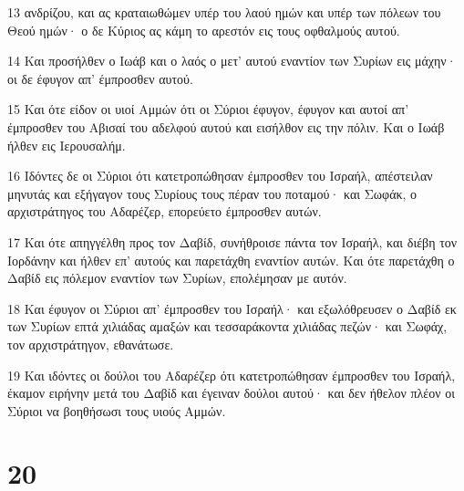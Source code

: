 \par 13 ανδρίζου, και ας κραταιωθώμεν υπέρ του λαού ημών και υπέρ των πόλεων του Θεού ημών· ο δε Κύριος ας κάμη το αρεστόν εις τους οφθαλμούς αυτού.
\par 14 Και προσήλθεν ο Ιωάβ και ο λαός ο μετ' αυτού εναντίον των Συρίων εις μάχην· οι δε έφυγον απ' έμπροσθεν αυτού.
\par 15 Και ότε είδον οι υιοί Αμμών ότι οι Σύριοι έφυγον, έφυγον και αυτοί απ' έμπροσθεν του Αβισαί του αδελφού αυτού και εισήλθον εις την πόλιν. Και ο Ιωάβ ήλθεν εις Ιερουσαλήμ.
\par 16 Ιδόντες δε οι Σύριοι ότι κατετροπώθησαν έμπροσθεν του Ισραήλ, απέστειλαν μηνυτάς και εξήγαγον τους Συρίους τους πέραν του ποταμού· και Σωφάκ, ο αρχιστράτηγος του Αδαρέζερ, επορεύετο έμπροσθεν αυτών.
\par 17 Και ότε απηγγέλθη προς τον Δαβίδ, συνήθροισε πάντα τον Ισραήλ, και διέβη τον Ιορδάνην και ήλθεν επ' αυτούς και παρετάχθη εναντίον αυτών. Και ότε παρετάχθη ο Δαβίδ εις πόλεμον εναντίον των Συρίων, επολέμησαν με αυτόν.
\par 18 Και έφυγον οι Σύριοι απ' έμπροσθεν του Ισραήλ· και εξωλόθρευσεν ο Δαβίδ εκ των Συρίων επτά χιλιάδας αμαξών και τεσσαράκοντα χιλιάδας πεζών· και Σωφάχ, τον αρχιστράτηγον, εθανάτωσε.
\par 19 Και ιδόντες οι δούλοι του Αδαρέζερ ότι κατετροπώθησαν έμπροσθεν του Ισραήλ, έκαμον ειρήνην μετά του Δαβίδ και έγειναν δούλοι αυτού· και δεν ήθελον πλέον οι Σύριοι να βοηθήσωσι τους υιούς Αμμών.

\chapter{20}

